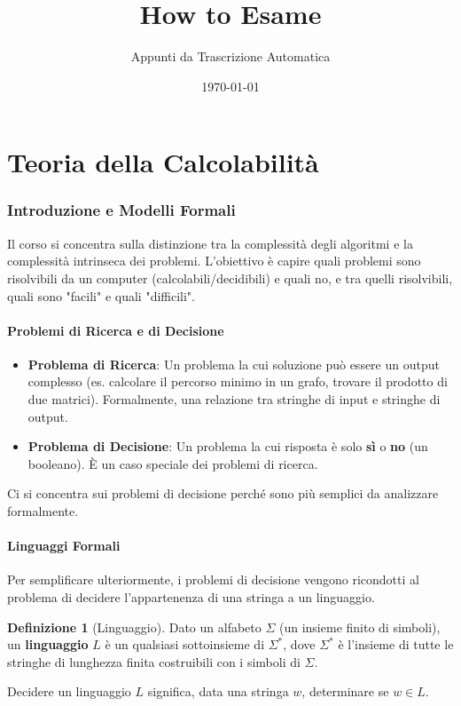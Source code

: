 \documentclass[a4paper]{article}
\title{How to Esame}
\author{Appunti da Trascrizione Automatica}
\date{\today}
\theoremstyle{definition} %
\newtheorem{definition}{Definizione}
\begin{document}
\maketitle
\tableofcontents
\newpage

\part{Teoria della Calcolabilità}

\section{Introduzione e Modelli Formali}
Il corso si concentra sulla distinzione tra la complessità degli algoritmi e la complessità intrinseca dei problemi. L'obiettivo è capire quali problemi sono risolvibili da un computer (calcolabili/decidibili) e quali no, e tra quelli risolvibili, quali sono "facili" e quali "difficili".

\subsection{Problemi di Ricerca e di Decisione}
\begin{itemize}
    \item \textbf{Problema di Ricerca}: Un problema la cui soluzione può essere un output complesso (es. calcolare il percorso minimo in un grafo, trovare il prodotto di due matrici). Formalmente, una relazione tra stringhe di input e stringhe di output.
    \item \textbf{Problema di Decisione}: Un problema la cui risposta è solo \textbf{sì} o \textbf{no} (un booleano). È un caso speciale dei problemi di ricerca.
\end{itemize}
Ci si concentra sui problemi di decisione perché sono più semplici da analizzare formalmente.

\subsection{Linguaggi Formali}
Per semplificare ulteriormente, i problemi di decisione vengono ricondotti al problema di decidere l'appartenenza di una stringa a un linguaggio.
\begin{definition}[Linguaggio]
Dato un alfabeto $\Sigma$ (un insieme finito di simboli), un \textbf{linguaggio} $L$ è un qualsiasi sottoinsieme di $\Sigma^*$, dove $\Sigma^*$ è l'insieme di tutte le stringhe di lunghezza finita costruibili con i simboli di $\Sigma$.
\end{definition}
Decidere un linguaggio $L$ significa, data una stringa $w$, determinare se $w \in L$.
\end{document}
